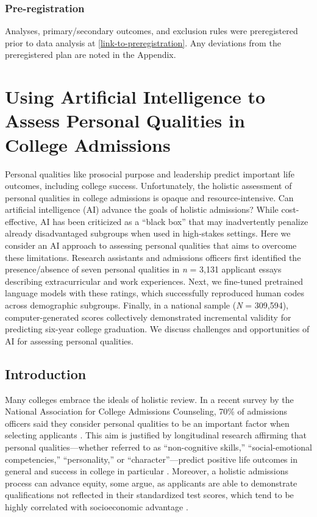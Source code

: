 \documentclass[11pt]{report}
\begin{document}
\begin{mainf}
\subsection{Pre-registration}
Analyses, primary/secondary outcomes, and exclusion rules were preregistered prior to data analysis at \url{[link-to-preregistration]}.
Any deviations from the preregistered plan are noted in the Appendix.


\chapter{Using Artificial Intelligence to Assess Personal Qualities in College Admissions}

Personal qualities like prosocial purpose and leadership predict important life outcomes, including college success. Unfortunately, the holistic assessment of personal qualities in college admissions is opaque and resource-intensive. Can artificial intelligence (AI) advance the goals of holistic admissions? While cost-effective, AI has been criticized as a “black box” that may inadvertently penalize already disadvantaged subgroups when used in high-stakes settings. Here we consider an AI approach to assessing personal qualities that aims to overcome these limitations. Research assistants and admissions officers first identified the presence/absence of seven personal qualities in \textit{n} = 3,131 applicant essays describing extracurricular and work experiences. Next, we fine-tuned pretrained language models with these ratings, which successfully reproduced human codes across demographic subgroups. Finally, in a national sample (\textit{N} = 309,594), computer-generated scores collectively demonstrated incremental validity for predicting six-year college graduation. We discuss challenges and opportunities of AI for assessing personal qualities.


\section{Introduction}

Many colleges embrace the ideals of holistic review. In a recent survey by the National Association for College Admissions Counseling, 70\% of admissions officers said they consider personal qualities to be an important factor when selecting applicants \cite{national_research_council_assessing_2011}. This aim is justified by longitudinal research affirming that personal qualities—whether referred to as “non-cognitive skills,” “social-emotional competencies,” “personality,” or “character”—predict positive life outcomes in general and success in college in particular 
 \cite{moffitt_gradient_2011, almlund_personality_2011, robbins_psychosocial_2004, kyllonen_personality_2014}. Moreover, a holistic admissions process can advance equity, some argue, as applicants are able to demonstrate qualifications not reflected in their standardized test scores, which tend to be highly correlated with socioeconomic advantage \cite{coleman_understanding_2018}.


\end{mainf}
\end{document}
